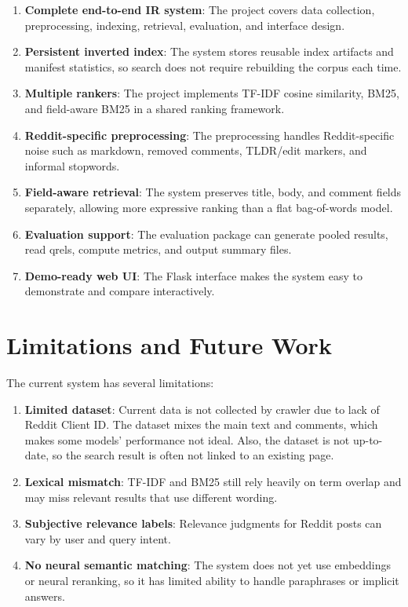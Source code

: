\documentclass[11pt]{article}
\begin{document}
\begin{enumerate}[label=(\arabic*)]
    \item \textbf{Complete end-to-end IR system}: The project covers data collection, preprocessing, indexing, retrieval, evaluation, and interface design.
    \item \textbf{Persistent inverted index}: The system stores reusable index artifacts and manifest statistics, so search does not require rebuilding the corpus each time.
    \item \textbf{Multiple rankers}: The project implements TF-IDF cosine similarity, BM25, and field-aware BM25 in a shared ranking framework.
    \item \textbf{Reddit-specific preprocessing}: The preprocessing handles Reddit-specific noise such as markdown, removed comments, TLDR/edit markers, and informal stopwords.
    \item \textbf{Field-aware retrieval}: The system preserves title, body, and comment fields separately, allowing more expressive ranking than a flat bag-of-words model.
    \item \textbf{Evaluation support}: The evaluation package can generate pooled results, read qrels, compute metrics, and output summary files.
    \item \textbf{Demo-ready web UI}: The Flask interface makes the system easy to demonstrate and compare interactively.
\end{enumerate}

\section{Limitations and Future Work}
The current system has several limitations:

\begin{enumerate}[label=(\arabic*)]
    \item \textbf{Limited dataset}: Current data is not collected by crawler due to lack of Reddit Client ID. The dataset mixes the main text and comments, which makes some models' performance not ideal. Also, the dataset is not up-to-date, so the search result is often not linked to an existing page. 
    \item \textbf{Lexical mismatch}: TF-IDF and BM25 still rely heavily on term overlap and may miss relevant results that use different wording.
    \item \textbf{Subjective relevance labels}: Relevance judgments for Reddit posts can vary by user and query intent.
    \item \textbf{No neural semantic matching}: The system does not yet use embeddings or neural reranking, so it has limited ability to handle paraphrases or implicit answers.
\end{enumerate}
\end{document}
